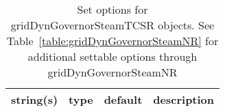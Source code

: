 \begin{table}[ht]
\centering
\begin{tabular}{p{5cm} c c p{7cm}}
\hline
string(s) & type & default & description \\
\hline
\hline
\end{tabular}
\caption{Set options for gridDynGovernorSteamTCSR objects. See Table~\ref{table:gridDynGovernorSteamNR} for additional settable options through gridDynGovernorSteamNR}
\label{table:gridDynGovernorSteamTCSR}
\end{table}
